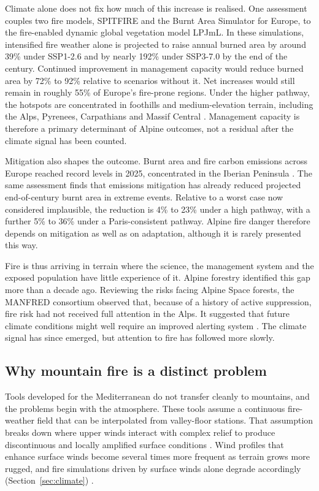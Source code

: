 \documentclass[11pt,a4paper]{article}
\begin{document}
Climate alone does not fix how much of this increase is realised. One assessment couples two fire models, SPITFIRE and the Burnt Area Simulator for Europe, to the fire-enabled dynamic global vegetation model LPJmL. In these simulations, intensified fire weather alone is projected to raise annual burned area by around 39\% under SSP1-2.6 and by nearly 192\% under SSP3-7.0 by the end of the century. Continued improvement in management capacity would reduce burned area by 72\% to 92\% relative to scenarios without it. Net increases would still remain in roughly 55\% of Europe's fire-prone regions. Under the higher pathway, the hotspots are concentrated in foothills and medium-elevation terrain, including the Alps, Pyrenees, Carpathians and Massif Central \citep{billing_future_2026}. Management capacity is therefore a primary determinant of Alpine outcomes, not a residual after the climate signal has been counted.

Mitigation also shapes the outcome. Burnt area and fire carbon emissions across Europe reached record levels in 2025, concentrated in the Iberian Peninsula \citep{burton_state_2026}. The same assessment finds that emissions mitigation has already reduced projected end-of-century burnt area in extreme events. Relative to a worst case now considered implausible, the reduction is 4\% to 23\% under a high pathway, with a further 5\% to 36\% under a Paris-consistent pathway. Alpine fire danger therefore depends on mitigation as well as on adaptation, although it is rarely presented this way.

Fire is thus arriving in terrain where the science, the management system and the exposed population have little experience of it. Alpine forestry identified this gap more than a decade ago. Reviewing the risks facing Alpine Space forests, the MANFRED consortium observed that, because of a history of active suppression, fire risk had not received full attention in the Alps. It suggested that future climate conditions might well require an improved alerting system \citep{jandl_management_2013}. The climate signal has since emerged, but attention to fire has followed more slowly.

\subsection{Why mountain fire is a distinct problem}

Tools developed for the Mediterranean do not transfer cleanly to mountains, and the problems begin with the atmosphere. These tools assume a continuous fire-weather field that can be interpolated from valley-floor stations. That assumption breaks down where upper winds interact with complex relief to produce discontinuous and locally amplified surface conditions \citep{sharples_overview_2009}. Wind profiles that enhance surface winds become several times more frequent as terrain grows more rugged, and fire simulations driven by surface winds alone degrade accordingly (Section~\ref{sec:climate}) \citep{ozaki_impact_2022}.
\end{document}
